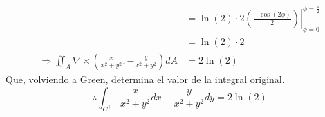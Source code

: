 \begin{solution}
\begin{align*}
        &= \ln(2)\cdot 2\left.\left(\frac{-\cos{(2\phi)}}{2}\right)\right|^{\phi=\frac{\pi}{2}}_{\phi=0}\\[10pt]
        &= \ln(2)\cdot 2\\[10pt]
        \Rightarrow \iint_{A} \nabla \times \left(\frac{x}{x^2+y^2},-\frac{y}{x^2+y^2}\right)dA &= 2\ln(2)
    \end{align*}
    Que, volviendo a Green, determina el valor de la integral original.
    \begin{equation*}
         \therefore \int_{C^+} \frac{x}{x^2+y^2}dx - \frac{y}{x^2+y^2}dy = 2\ln(2)
    \end{equation*}
\end{solution}